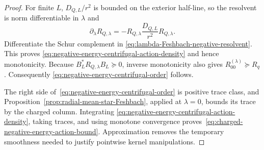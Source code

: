 \documentclass[11pt]{article}
\theoremstyle{definition}
\theoremstyle{remark}
\begin{document}
\begin{proof}
For finite $L$, $D_{Q,L}/r^2$ is bounded on the exterior half-line, so the
resolvent is norm differentiable in $\lambda$ and
\begin{equation}
 \partial_\lambda R_{Q,\lambda}
 =-R_{Q,\lambda}\frac{D_{Q,L}}{r^2}R_{Q,\lambda}.
\end{equation}
Differentiate the Schur complement in
\eqref{eq:lambda-Feshbach-negative-resolvent}.  This proves
\eqref{eq:negative-energy-centrifugal-action-density} and hence monotonicity.
Because $B_L^*R_{Q,\lambda}B_L\succeq0$, inverse monotonicity also gives
$R_{00}^{(\lambda)}\succeq R_q$.  Consequently
\eqref{eq:negative-energy-centrifugal-order} follows.

The right side of~\eqref{eq:negative-energy-centrifugal-order} is positive
trace class, and Proposition~\ref{prop:radial-mean-star-Feshbach}, applied at
$\lambda=0$, bounds its trace by the charged column.  Integrating
\eqref{eq:negative-energy-centrifugal-action-density}, taking traces, and using
monotone convergence proves~\eqref{eq:charged-negative-energy-action-bound}.
Approximation removes the temporary smoothness needed to justify pointwise
kernel manipulations.
\end{proof}
\end{document}
